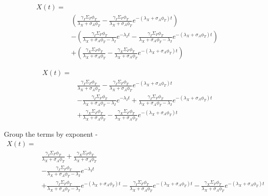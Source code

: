 \documentclass[11pt,a4paper]{article}
\begin{document}
\begin{equation} 
    \begin{aligned}
        X(t)=\\
        &(\frac{\gamma_I\Sigma_F\phi_T}{\lambda_X+\sigma_A\phi_T}-\frac{\gamma_I\Sigma_F\phi_T}{\lambda_X+\sigma_A\phi_T}e^{-(\lambda_X+\sigma_A\phi_T)t})\\
        &-(\frac{\gamma_I\Sigma_F\phi_T}{\lambda_X+\sigma_A\phi_T-\lambda_I}e^{-\lambda_I t}
        -\frac{\gamma_I\Sigma_F\phi_T}{\lambda_X+\sigma_A\phi_T-\lambda_I}e^{-(\lambda_X+\sigma_A\phi_T)t})\\
        &+(\frac{\gamma_X\Sigma_F\phi_T}{\lambda_X+\sigma_A\phi_T}-\frac{\gamma_X\Sigma_F\phi_T}{\lambda_X+\sigma_A\phi_T}e^{-(\lambda_X+\sigma_A\phi_T)t}) 
    \end{aligned}
\end{equation}

\begin{equation} 
    \begin{aligned}
        X(t)=\\
        &\frac{\gamma_I\Sigma_F\phi_T}{\lambda_X+\sigma_A\phi_T}-\frac{\gamma_I\Sigma_F\phi_T}{\lambda_X+\sigma_A\phi_T}e^{-(\lambda_X+\sigma_A\phi_T)t}\\
        &-\frac{\gamma_I\Sigma_F\phi_T}{\lambda_X+\sigma_A\phi_T-\lambda_I}e^{-\lambda_I t}
        +\frac{\gamma_I\Sigma_F\phi_T}{\lambda_X+\sigma_A\phi_T-\lambda_I}e^{-(\lambda_X+\sigma_A\phi_T)t}\\
        &+\frac{\gamma_X\Sigma_F\phi_T}{\lambda_X+\sigma_A\phi_T}
        -\frac{\gamma_X\Sigma_F\phi_T}{\lambda_X+\sigma_A\phi_T}e^{-(\lambda_X+\sigma_A\phi_T)t} 
    \end{aligned}
\end{equation}

Group the terms by exponent - 
\begin{equation} 
    \begin{aligned}
        X(t)=\\
        &\frac{\gamma_I\Sigma_F\phi_T}{\lambda_X+\sigma_A\phi_T}+\frac{\gamma_X\Sigma_F\phi_T}{\lambda_X+\sigma_A\phi_T}\\
        &-\frac{\gamma_I\Sigma_F\phi_T}{\lambda_X+\sigma_A\phi_T-\lambda_I}e^{-\lambda_I t}\\
        &+\frac{\gamma_I\Sigma_F\phi_T}{\lambda_X+\sigma_A\phi_T-\lambda_I}e^{-(\lambda_X+\sigma_A\phi_T)t}
        -\frac{\gamma_I\Sigma_F\phi_T}{\lambda_X+\sigma_A\phi_T}e^{-(\lambda_X+\sigma_A\phi_T)t}
        -\frac{\gamma_X\Sigma_F\phi_T}{\lambda_X+\sigma_A\phi_T}e^{-(\lambda_X+\sigma_A\phi_T)t} 
    \end{aligned}
\end{equation}
\end{document}
